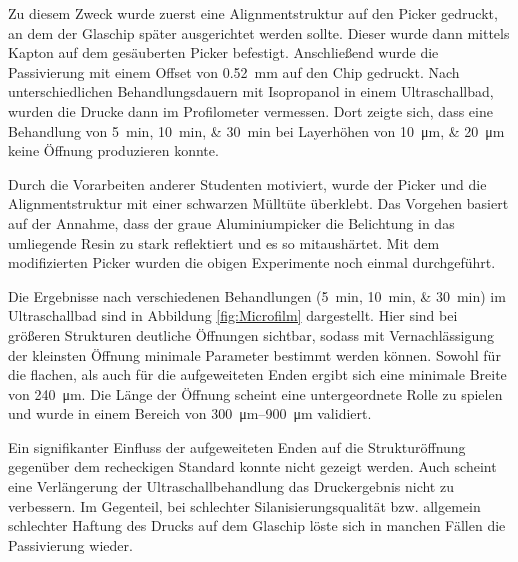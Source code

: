 Zu diesem Zweck wurde zuerst eine Alignmentstruktur auf den Picker gedruckt, an dem der Glaschip später ausgerichtet werden sollte. Dieser wurde dann mittels Kapton auf dem gesäuberten Picker befestigt. Anschließend wurde die Passivierung mit einem Offset von \SI{0.52}{\milli\meter} auf den Chip gedruckt. Nach unterschiedlichen Behandlungsdauern mit Isopropanol in einem Ultraschallbad, wurden die Drucke dann im Profilometer vermessen. Dort zeigte sich, dass eine Behandlung von \SIlist{5;10;30}{\minute} bei Layerhöhen von \SIlist{10;20}{\micro\meter} keine Öffnung produzieren konnte.

Durch die Vorarbeiten anderer Studenten motiviert, wurde der Picker und die Alignmentstruktur mit einer schwarzen Mülltüte überklebt. Das Vorgehen basiert auf der Annahme, dass der graue Aluminiumpicker die Belichtung in das umliegende Resin zu stark reflektiert und es so mitaushärtet. Mit dem modifizierten Picker wurden die obigen Experimente noch einmal durchgeführt.

Die Ergebnisse nach verschiedenen Behandlungen (\SIlist{5;10;30}{\minute}) im Ultraschallbad sind in Abbildung \ref{fig:Microfilm} dargestellt. Hier sind bei größeren Strukturen deutliche Öffnungen sichtbar, sodass mit Vernachlässigung der kleinsten Öffnung minimale Parameter bestimmt werden können. Sowohl für die flachen, als auch für die aufgeweiteten Enden ergibt sich eine minimale Breite von \SI{240}{\micro\meter}. Die Länge der Öffnung scheint eine untergeordnete Rolle zu spielen und wurde in einem Bereich von \SIrange{300}{900}{\micro\meter} validiert.

Ein signifikanter Einfluss der aufgeweiteten Enden auf die Strukturöffnung gegenüber dem recheckigen Standard konnte nicht gezeigt werden. Auch scheint eine Verlängerung der Ultraschallbehandlung das Druckergebnis nicht zu verbessern. Im Gegenteil, bei schlechter Silanisierungsqualität bzw. allgemein schlechter Haftung des Drucks auf dem Glaschip löste sich in manchen Fällen die Passivierung wieder.

